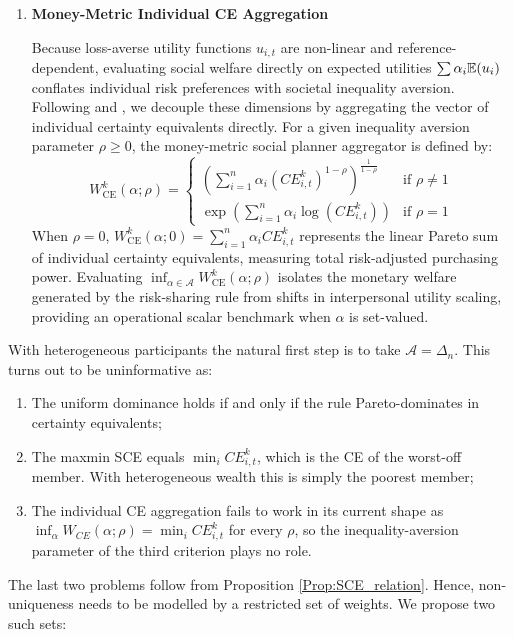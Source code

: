 \begin{enumerate}
    \item \textbf{Money-Metric Individual CE Aggregation}
    
    Because loss-averse utility functions $u_{i,t}$ are non-linear and reference-dependent, evaluating social welfare directly on expected utilities $\sum \alpha_i \mathbb{E}(u_i)$ conflates individual risk preferences with societal inequality aversion. Following \citet{Atkinson_1970} and \citet{Grantetal2010}, we decouple these dimensions by aggregating the vector of individual certainty equivalents directly. For a given inequality aversion parameter $\rho \geq 0$, the money-metric social planner aggregator is defined by:
    \begin{equation}
        W_{\text{CE}}^k(\alpha; \rho) = \begin{cases} \left( \sum_{i=1}^n \alpha_i (CE_{i,t}^k)^{1-\rho} \right)^{\frac{1}{1-\rho}} & \text{if } \rho \neq 1 \\ \exp\left( \sum_{i=1}^n \alpha_i \log(CE_{i,t}^k) \right) & \text{if } \rho = 1 \end{cases}
    \end{equation}
    When $\rho = 0$, $W_{\text{CE}}^k(\alpha; 0) = \sum_{i=1}^n \alpha_i CE_{i,t}^k$ represents the linear Pareto sum of individual certainty equivalents, measuring total risk-adjusted purchasing power. Evaluating $\inf_{\alpha \in \mathcal{A}} W_{\text{CE}}^k(\alpha; \rho)$ isolates the monetary welfare generated by the risk-sharing rule from shifts in interpersonal utility scaling, providing an operational scalar benchmark when $\alpha$ is set-valued.
\end{enumerate}
With heterogeneous participants the natural first step is to take $\mathcal{A} = \Delta_n$. This turns out to be uninformative as:
\begin{enumerate}
    \item The uniform dominance holds if and only if the rule Pareto-dominates in certainty equivalents;
    \item The maxmin SCE \citep{Gilboa_Schmeidler_1989_maxmin} equals $\min_i CE_{i,t}^k$, which is the CE of the worst-off member. With heterogeneous wealth this is simply the poorest member;
    \item The individual CE aggregation fails to work in its current shape as $\inf_\alpha W_{CE}(\alpha;\rho)=\min_iCE^k_{i,t}$ for every $\rho$, so the inequality-aversion parameter of the third criterion plays no role.
\end{enumerate}
The last two problems follow from Proposition \ref{Prop:SCE_relation}. Hence, non-uniqueness needs to be modelled by a restricted set of weights. We propose two such sets:
